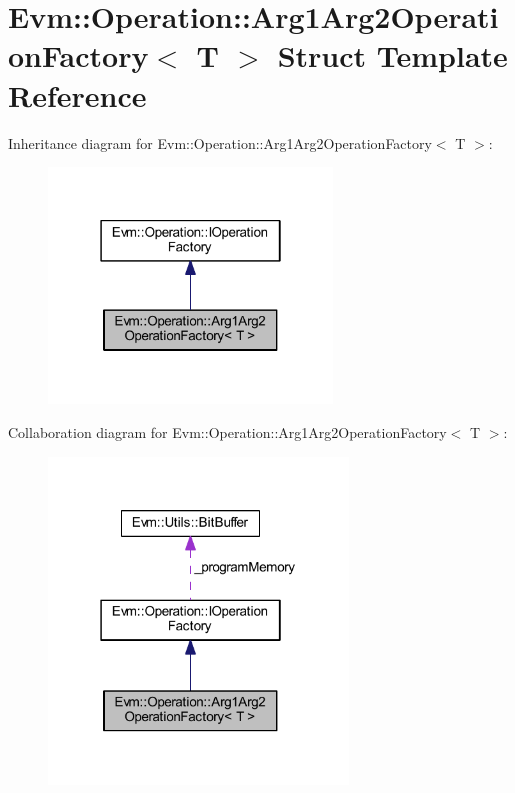 \hypertarget{struct_evm_1_1_operation_1_1_arg1_arg2_operation_factory}{}\section{Evm\+:\+:Operation\+:\+:Arg1\+Arg2\+Operation\+Factory$<$ T $>$ Struct Template Reference}
\label{struct_evm_1_1_operation_1_1_arg1_arg2_operation_factory}


Inheritance diagram for Evm\+:\+:Operation\+:\+:Arg1\+Arg2\+Operation\+Factory$<$ T $>$\+:
\nopagebreak
\begin{figure}[H]
\begin{center}
\leavevmode
\includegraphics[width=214pt]{struct_evm_1_1_operation_1_1_arg1_arg2_operation_factory__inherit__graph}
\end{center}
\end{figure}


Collaboration diagram for Evm\+:\+:Operation\+:\+:Arg1\+Arg2\+Operation\+Factory$<$ T $>$\+:
\nopagebreak
\begin{figure}[H]
\begin{center}
\leavevmode
\includegraphics[width=226pt]{struct_evm_1_1_operation_1_1_arg1_arg2_operation_factory__coll__graph}
\end{center}
\end{figure}
